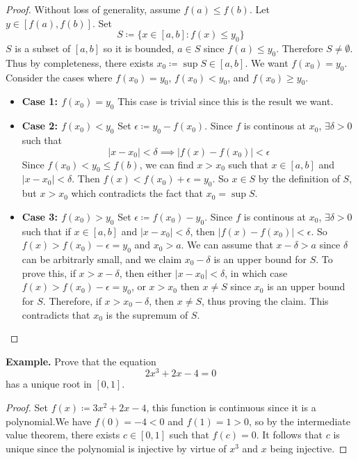 \documentclass[openany]{report}
\begin{document}
\begin{proof}
    Without loss of generality, assume $f(a) \leq f(b)$. Let $y \in [f(a), f(b)]$. Set 
    \[S \coloneqq \{x \in [a,b]: f(x) \leq y_0\}\]
    $S$ is a subset of $[a,b]$ so it is bounded, $a \in S$ since $f(a) \leq y_0$. Therefore $S \neq \emptyset$. Thus by completeness, there exists $x_0 \coloneqq \sup S \in [a,b]$. We want $f(x_0) = y_0$. Consider the cases where $f(x_0) = y_0$, $f(x_0) < y_0$, and $f(x_0) \geq y_0$.
    \begin{itemize}
        \item \textbf{Case 1: $f(x_0) = y_0$} This case is trivial since this is the result we want. 
        \item \textbf{Case 2: $f(x_0) < y_0$} Set $\epsilon \coloneqq y_0 - f(x_0)$. Since $f$ is continous at $x_0$, $\exists \delta > 0$ such that 
        \[|x - x_0| < \delta \implies |f(x) - f(x_0)| < \epsilon\]
        Since $f(x_0) < y_0 \leq f(b)$, we can find $x > x_0$ such that $x \in [a,b]$ and $|x-x_0| < \delta$. Then $f(x) < f(x_0) + \epsilon = y_0$. So $x \in S$ by the definition of $S$, but $x > x_0$ which contradicts the fact that $x_0 = \sup S$.
        \item \textbf{Case 3: $f(x_0) > y_0$} Set $\epsilon \coloneqq f(x_0) - y_0$. Since $f$ is continous at $x_0$, $\exists \delta > 0$ such that if $x \in [a,b]$ and $|x-x_0| < \delta$, then $|f(x) - f(x_0)| < \epsilon$. So $f(x) > f(x_0) - \epsilon = y_0$ and $x_0 > a$. We can assume that $x - \delta > a$ since $\delta$ can be arbitrarly small, and we claim $x_0 - \delta$ is an upper bound for $S$. To prove this, if $x > x - \delta$, then either $|x - x_0| < \delta$, in which case $f(x) > f(x_0) - \epsilon = y_0$, or $x > x_0$ then $x \neq S$ since $x_0$ is an upper bound for $S$. Therefore, if $x >  x_0 - \delta$, then $x \neq S$, thus proving the claim. This contradicts that $x_0$ is the supremum of $S$.  
    \end{itemize}
\end{proof}
\noindent
\textbf{Example.} Prove that the equation 
\[2x^3 + 2x - 4 = 0\]
has a unique root in $[0,1]$.
\begin{proof}
    Set $f(x) \coloneqq 3x^2 + 2x - 4$, this function is continuous since it is a polynomial.We have $f(0) = -4 < 0$ and $f(1) = 1 > 0$, so by the intermediate value theorem, there exists $c \in [0,1]$ such that $f(c) = 0$. It follows that $c$ is unique since the polynomial is injective by virtue of $x^3$ and $x$ being injective. 
\end{proof}
\end{document}

